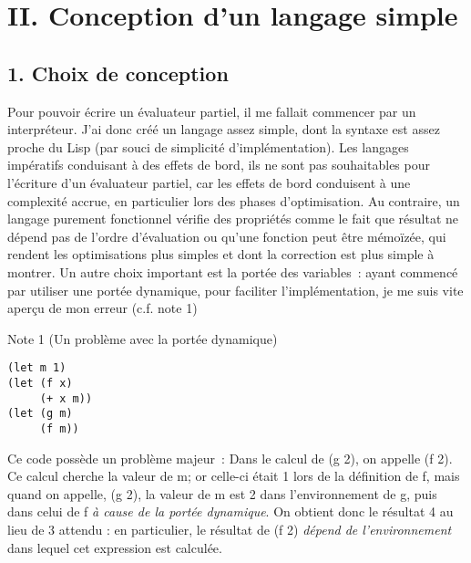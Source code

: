 \documentclass[a4paper,11pt]{article}
\newcommand{\code}[1]{{\fontfamily{pcr}\selectfont #1}}
\begin{document}
\section{II. Conception d'un langage simple}

\subsection{1. Choix de conception}

Pour pouvoir écrire un évaluateur partiel, il me fallait commencer par
un interpréteur. J'ai donc créé un langage assez simple, dont la
syntaxe est assez proche du Lisp (par souci de simplicité
d'implémentation). Les langages impératifs conduisant à des effets de
bord, ils ne sont pas souhaitables pour l'écriture d'un évaluateur
partiel, car les effets de bord conduisent à une complexité accrue, en
particulier lors des phases d'optimisation. Au contraire, un langage
purement fonctionnel vérifie des propriétés comme le fait que résultat
ne dépend pas de l'ordre d'évaluation ou qu'une fonction peut être
mémoïzée, qui rendent les optimisations plus simples et dont la
correction est plus simple à montrer.  Un autre choix important est la
portée des variables~: ayant commencé par utiliser une portée
dynamique, pour faciliter l'implémentation, je me suis vite aperçu de
mon erreur (c.f. note 1) \\

\begin{tcolorbox}
{\Large Note 1 \normalsize(Un problème avec la portée dynamique)}

\begin{lstlisting}[frame=single]
(let m 1)
(let (f x)
     (+ x m))
(let (g m)
     (f m))
\end{lstlisting}

Ce code possède un problème majeur~:
Dans le calcul de \code{(g 2)}, on appelle \code{(f 2)}.
Ce calcul cherche la valeur de \code{m}; or
celle-ci était 1 lors de la définition de
\code{f}, mais quand on appelle, \code{(g 2)}, la valeur de \code{m}
est 2 dans l'environnement de \code{g}, puis dans celui
de \code{f} \emph{à cause de la portée dynamique}. On obtient
donc le résultat 4 au lieu de 3 attendu : en particulier,
le résultat de \code{(f 2)} \emph{dépend de l'environnement} dans
lequel cet expression est calculée.
\end{tcolorbox}
\end{document}
